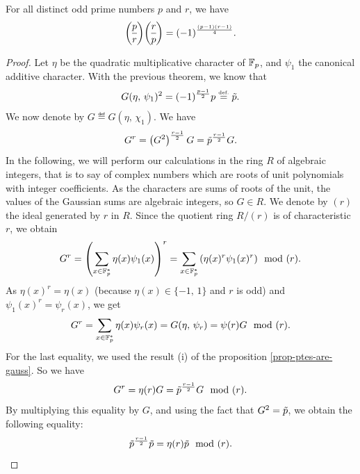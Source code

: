 \begin{thm}
For all distinct odd prime numbers $ p $ and $ r $, we have
\begin{equation}
\label{eq-reciprocity-quadratic}
\legsymb{p}{r} \legsymb{r}{p} = (-1)^{\frac{(p-1) (r-1)}{4}}.
\end{equation}
\end{thm}
\begin{proof}
 Let $ \eta $ be the quadratic multiplicative character of $ \mathbb{F}_p $, and $ \psi_1 $ the canonical additive character. With the previous theorem, we know that
\begin{equation*}
G (\eta, \, \psi_1)^2 = (-1)^{\frac{p-1}{2}} p \stackrel{\mbox{\upshape\tiny def.}}{=} \tilde{p}.
\end{equation*}
We now denote by $ G \eqdef G (\eta, \, \chi_1) $. We have
\begin{equation*}
G^r = \left(G^2 \right)^{\frac{r-1}{2}} G = \tilde{p}^{\frac{r-1}{2}} G.
\end{equation*}
In the following, we will perform our calculations in the ring $ R $ of algebraic integers, that is to say of complex numbers which are roots of unit polynomials with integer coefficients. As the characters are sums of roots of the unit, the values of the Gaussian sums are algebraic integers, so $ G \in R $. We denote by $ (r) $ the ideal generated by $ r $ in $ R $. Since the quotient ring $ R / (r) $ is of characteristic $ r $, we obtain
\begin{equation*}
G^r = \left(\sum_{x \in \mathbb{F}_p^*}{\eta (x) \psi_1 (x)} \right)^r = \sum_{x \in \mathbb{F}_p^*}{\left(\eta (x)^r \psi_1 (x)^r \right)} \mod{(r)}.
\end{equation*}
As $ \eta (x)^r = \eta (x) $ (because $ \eta (x) \in \{- 1, \, 1\} $ and $ r $ is odd) and $ \psi_1 ( x)^r = \psi_r (x) $, we get
\begin{equation*}
G^r = \sum_{x \in \mathbb{F}_p^*}{\eta (x) \psi_r (x)} = G (\eta, \, \psi_r) = \psi (r) G \mod{(r )}.
\end{equation*}
For the last equality, we used the result (i) of the proposition \ref{prop-ptes-are-gauss}. So we have
\begin{equation*}
G^r = \eta (r) G = \tilde{p}^{\frac{r-1}{2}} G \mod{(r)}.
\end{equation*}
By multiplying this equality by $ G $, and using the fact that $ G^2 = \tilde{p} $, we obtain the following equality:
\begin{equation*}
\tilde{p}^{\frac{r-1}{2}} \tilde{p} = \eta (r) \tilde{p} \mod{(r)}.
\end{equation*}

\end{proof}
